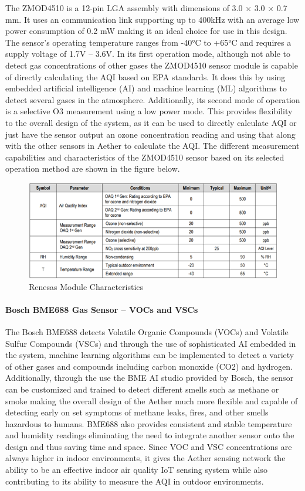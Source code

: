 The ZMOD4510 is a 12-pin LGA assembly with dimensions of 3.0 × 3.0 × 0.7 mm. It uses an \iic communication link supporting up to 400kHz with an average low power consumption of 0.2 mW making it an ideal choice for use in this design. The sensor’s operating temperature ranges from -40°C to +65°C and requires a supply voltage of 1.7V – 3.6V. In its first operation mode, although not able to detect gas concentrations of other gases the ZMOD4510 sensor module is capable of directly calculating the AQI based on EPA standards. It does this by using embedded artificial intelligence (AI) and machine learning (ML) algorithms to detect several gases in the atmosphere. Additionally, its second mode of operation is a selective O3 measurement using a low power mode. This provides flexibility to the overall design of the system, as it can be used to directly calculate AQI or just have the sensor output an ozone concentration reading and using that along with the other sensors in Aether to calculate the AQI. The different measurement capabilities and characteristics of the ZMOD4510 sensor based on its selected operation method are shown in the figure below. 

\begin{figure}
\centering
\includegraphics[width=6in]{figures/Renesas Sensor Op.png}
\caption{Renesas Module Characteristics \cite{ds-Renesas-ZMOD}}
\label{ZMOD4510 Table}
\end{figure}

\paragraph{Bosch BME688 Gas Sensor – VOCs and VSCs}
The Bosch BME688 detects Volatile Organic Compounds (VOCs) and Volatile Sulfur Compounds (VSCs) and through the use of sophisticated AI embedded in the system, machine learning algorithms can be implemented to detect a variety of other gases and compounds including carbon monoxide (CO2) and hydrogen. Additionally, through the use the BME AI studio provided by Bosch, the sensor can be customized and trained to detect different smells such as methane or smoke making the overall design of the Aether much more flexible and capable of detecting early on set symptoms of methane leaks, fires, and other smells hazardous to humans. BME688 also provides consistent and stable temperature and humidity readings eliminating the need to integrate another sensor onto the design and thus saving time and space. Since VOC and VSC concentrations are always higher in indoor environments, it gives the Aether sensing network the ability to be an effective indoor air quality IoT sensing system while also contributing to its ability to measure the AQI in outdoor environments. 

